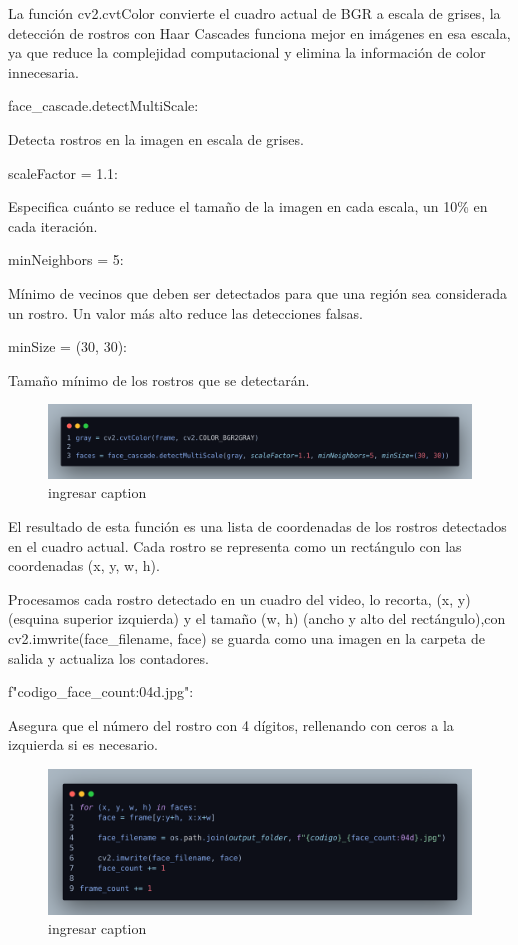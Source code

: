 \documentclass[12pt]{article}
\begin{document}
{La función cv2.cvtColor convierte el cuadro actual de BGR a escala de grises, la detección de rostros con Haar Cascades funciona mejor en imágenes en esa escala, ya que reduce la complejidad computacional y elimina la información de color innecesaria. 

\begin{itemize}
    {\bfseries\item face\_cascade.detectMultiScale:} Detecta rostros en la imagen en escala de grises.
    {\bfseries\item scaleFactor = 1.1:} Especifica cuánto se reduce el tamaño de la imagen en cada escala, un 10\% en cada iteración.
    {\bfseries\item minNeighbors = 5:} Mínimo de vecinos que deben ser detectados para que una región sea considerada un rostro. Un valor más alto reduce las detecciones falsas.
    {\bfseries\item minSize  = (30, 30):} Tamaño mínimo de los rostros que se detectarán.
\end{itemize}

\begin{figure}[h]
    \centering
    \includegraphics[width=1.0\linewidth]{imagenes/des08.png}
    \caption{ingresar caption}
    \label{fig:enter-label}
\end{figure}

El resultado de esta función es una lista de coordenadas de los rostros detectados en el cuadro actual. Cada rostro se representa como un rectángulo con las coordenadas (x, y, w, h).

Procesamos cada rostro detectado en un cuadro del video, lo recorta, (x, y) (esquina superior izquierda) y el tamaño (w, h) (ancho y alto del rectángulo),con cv2.imwrite(face\_filename, face) se guarda como una imagen en la carpeta de salida y actualiza los contadores.

\begin{itemize}
    {\bfseries\item f"{codigo}\_{face\_count:04d}.jpg":} Asegura que el número del rostro con 4 dígitos, rellenando con ceros a la izquierda si es necesario.
\end{itemize}

\begin{figure}[h]
    \centering
    \includegraphics[width=1.0\linewidth]{imagenes/des09.png}
    \caption{ingresar caption}
    \label{fig:enter-label}
\end{figure}

}
\end{document}
